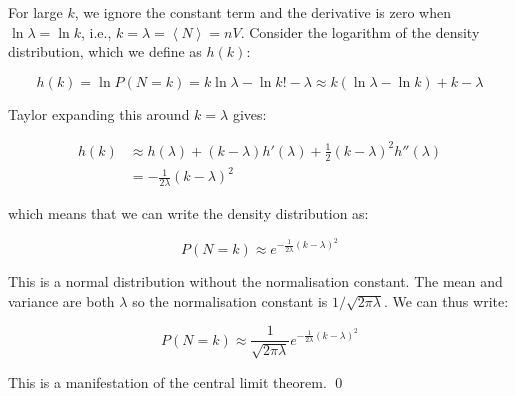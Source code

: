 \documentclass[12pt]{article}
\begin{document}
For large $k$, we ignore the constant term and the derivative is zero when $\ln{\lambda} = \ln{k}$, i.e., $k = \lambda = \left\langle N \right\rangle = nV$. Consider the logarithm of the density distribution, which we define as $h(k)$:

\begin{equation}
    h(k) = \ln{P(N = k)} = k \ln{\lambda} - \ln{k!} - \lambda \approx k (\ln{\lambda} - \ln{k}) + k - \lambda
\end{equation}

Taylor expanding this around $k = \lambda$ gives:

\begin{equation}
    \begin{split}
        h(k) &\approx h(\lambda) + (k - \lambda) h'(\lambda) + \frac{1}{2} (k - \lambda)^{2} h''(\lambda) \\
        &= -\frac{1}{2\lambda} (k - \lambda)^{2}
    \end{split}
\end{equation}

which means that we can write the density distribution as:

\begin{equation}
    P(N = k) \approx e^{-\frac{1}{2\lambda} (k - \lambda)^{2}}
\end{equation}

This is a normal distribution without the normalisation constant. The mean and variance are both $\lambda$ so the normalisation constant is $1/\sqrt{2\pi\lambda}$. We can thus write:

\begin{equation}
    P(N = k) \approx \frac{1}{\sqrt{2\pi\lambda}} e^{-\frac{1}{2\lambda} (k - \lambda)^{2}}
\end{equation}

This is a manifestation of the central limit theorem.
\qed
\end{document}
